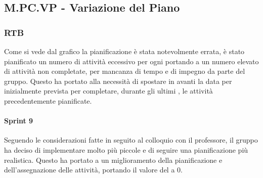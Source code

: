 \subsection{M.PC.VP - Variazione del Piano}
\label{sec:VP}

\subsubsection{RTB}
Come si vede dal grafico la pianificazione è stata notevolmente errata, è stato pianificato un numero di attività 
eccessivo per ogni  portando a un numero elevato di attività non completate, per mancanza di tempo e di impegno da parte del gruppo.
Questo ha portato alla necessità di spostare in avanti la data per  inizialmente prevista per completare, durante gli ultimi , le attività precedentemente pianificate.

\paragraph{Sprint 9}
Seguendo le considerazioni fatte in seguito al colloquio con il professore, il gruppo ha deciso di implementare  molto più piccole e di seguire una pianificazione più realistica.
Questo ha portato a un miglioramento della pianificazione e dell'assegnazione delle attività, portando il valore del  a 0.

